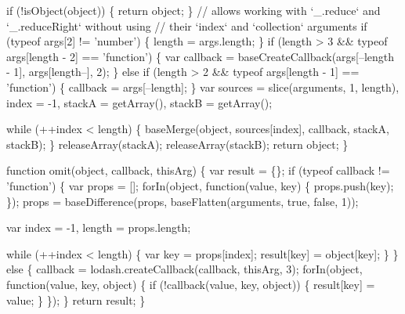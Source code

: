 \begin{DoxyCodeInclude}
      \textcolor{keywordflow}{if} (!isObject(\textcolor{keywordtype}{object})) \{
        \textcolor{keywordflow}{return} object;
      \}
      \textcolor{comment}{// allows working with `\_.reduce` and `\_.reduceRight` without using}
      \textcolor{comment}{// their `index` and `collection` arguments}
      \textcolor{keywordflow}{if} (typeof args[2] != \textcolor{stringliteral}{'number'}) \{
        length = args.length;
      \}
      \textcolor{keywordflow}{if} (length > 3 && typeof args[length - 2] == \textcolor{stringliteral}{'function'}) \{
        var callback = baseCreateCallback(args[--length - 1], args[length--], 2);
      \} \textcolor{keywordflow}{else} \textcolor{keywordflow}{if} (length > 2 && typeof args[length - 1] == \textcolor{stringliteral}{'function'}) \{
        callback = args[--length];
      \}
      var sources = slice(arguments, 1, length),
          index = -1,
          stackA = getArray(),
          stackB = getArray();

      \textcolor{keywordflow}{while} (++index < length) \{
        baseMerge(\textcolor{keywordtype}{object}, sources[index], callback, stackA, stackB);
      \}
      releaseArray(stackA);
      releaseArray(stackB);
      \textcolor{keywordflow}{return} object;
    \}

    \textcolor{keyword}{function} omit(\textcolor{keywordtype}{object}, callback, thisArg) \{
      var result = \{\};
      \textcolor{keywordflow}{if} (typeof callback != \textcolor{stringliteral}{'function'}) \{
        var props = [];
        forIn(\textcolor{keywordtype}{object}, \textcolor{keyword}{function}(value, key) \{
          props.push(key);
        \});
        props = baseDifference(props, baseFlatten(arguments, \textcolor{keyword}{true}, \textcolor{keyword}{false}, 1));

        var index = -1,
            length = props.length;

        \textcolor{keywordflow}{while} (++index < length) \{
          var key = props[index];
          result[key] = \textcolor{keywordtype}{object}[key];
        \}
      \} \textcolor{keywordflow}{else} \{
        callback = lodash.createCallback(callback, thisArg, 3);
        forIn(\textcolor{keywordtype}{object}, \textcolor{keyword}{function}(value, key, \textcolor{keywordtype}{object}) \{
          \textcolor{keywordflow}{if} (!callback(value, key, \textcolor{keywordtype}{object})) \{
            result[key] = value;
          \}
        \});
      \}
      \textcolor{keywordflow}{return} result;
    \}


\end{DoxyCodeInclude}
